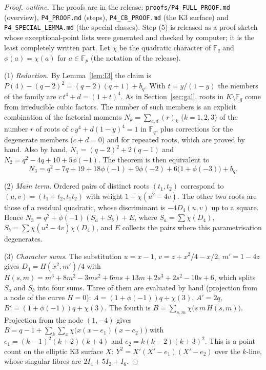 \documentclass[11pt]{article}
\begin{document}
\begin{proof}[Proof, outline]
The proofs are in the release: \texttt{proofs/P4\_FULL\_PROOF.md} (overview), \texttt{P4\_PROOF.md} (steps), \texttt{P4\_CB\_PROOF.md} (the K3 surface) and \texttt{P4\_SPECIAL\_LEMMA.md} (the special classes). Step (5) is released as a proof sketch whose exceptional-point lists were generated and checked by computer; it is the least completely written part. Let $\chi$ be the quadratic character of $\mathbb F_q$ and $\phi(a)=\chi(a)$ for $a\in\mathbb F_p$ (the notation of the release).

(1) \emph{Reduction.} By Lemma~\ref{lem:I3} the claim is $P(4)-(q-2)^2=(q-2)(q+1)+b_q$. With $t=y/(1-y)$ the members of the family are $c\,t^4+d=(1+t)^4$. As in Section~\ref{sec:gal}, roots in $K\setminus\mathbb F_q$ come from irreducible cubic factors. The number of such members is an explicit combination of the factorial moments $N_k=\sum_{c,d}(r)_k$ ($k=1,2,3$) of the number $r$ of roots of $c\,y^4+d(1-y)^4=1$ in $\mathbb F_q$, plus corrections for the degenerate members ($c+d=0$) and for repeated roots, which are proved by hand. Also by hand, $N_1=(q-2)^2+2(q-1)$ and $N_2=q^2-4q+10+5\phi(-1)$. The theorem is then equivalent to
\[N_3=q^2-7q+19+18\phi(-1)+9\phi(-2)+6\bigl(1+\phi(-3)\bigr)+b_q.\tag{N3}\]

(2) \emph{Main term.} Ordered pairs of distinct roots $(t_1,t_2)$ correspond to $(u,v)=(t_1+t_2,t_1t_2)$ with weight $1+\chi(u^2-4v)$. The other two roots are those of a residual quadratic, whose discriminant is $-4D_4(u,v)$ up to a square. Hence $N_3=q^2+\phi(-1)(S_a+S_b)+E$, where $S_a=\sum\chi(D_4)$, $S_b=\sum\chi(u^2-4v)\chi(D_4)$, and $E$ collects the pairs where this parametrisation degenerates.

(3) \emph{Character sums.} The substitution $u=x-1$, $v=z+x^2/4-x/2$, $m'=1-4z$ gives $D_4=H(x^2,m')/4$ with
$H(s,m)=m^3+8m^2-3ms^2+6ms+13m+2s^3+2s^2-10s+6$, which splits $S_a$ and $S_b$ into four sums. Three of them are evaluated by hand (projection from a node of the curve $H=0$): $A=(1+\phi(-1))q+\chi(3)$, $A'=2q$, $B'=(1+\phi(-1))q+\chi(3)$. The fourth is
$B=\sum_{s,m}\chi\bigl(s\,m\,H(s,m)\bigr)$. Projection from the node $(1,-4)$ gives $B=q-1+\sum_{k}\sum_{x}\chi\bigl(x(x-e_1)(x-e_2)\bigr)$ with $e_1=(k-1)^2(k+2)(k+4)$ and $e_2=k(k-2)(k+3)^2$. This is a point count on the elliptic K3 surface
$X:\ Y^2=X'(X'-e_1)(X'-e_2)$ over the $k$-line, whose singular fibres are $2I_4+5I_2+I_6$.


\end{proof}
\end{document}
